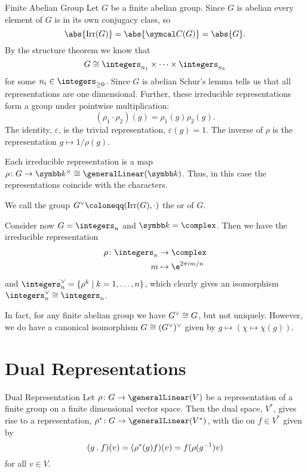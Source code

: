 \begin{exm}{Finite Abelian Group}{}
    Let \(G\) be a finite abelian group.
    Since \(G\) is abelian every element of \(G\) is in its own conjugacy class, so
    \begin{equation}
        \abs{\Irr(G)} = \abs{\conjugacyClasses(G)} = \abs{G}.
    \end{equation}
    By the structure theorem we know that
    \begin{equation}
        G \isomorphic \integers_{n_1} \times \dotsb \times \integers_{n_k}
    \end{equation}
    for some \(n_i \in \integers_{\ge 0}\).
    Since \(G\) is abelian Schur's lemma tells us that all representations are one dimensional.
    Further, these irreducible representations form a group under pointwise multiplication:
    \begin{equation}
        (\rho_1 \cdot \rho_2)(g) = \rho_1(g)\rho_2(g).
    \end{equation}
    The identity, \(\varepsilon\), is the trivial representation, \(\varepsilon(g) = 1\).
    The inverse of \(\rho\) is the representation \(g \mapsto 1/\rho(g)\).
    
    Each irreducible representation is a map \(\rho \colon G \to \field^{\times} \isomorphic \generalLinear(\field)\).
    Thus, in this case the representations coincide with the characters.
    
    We call the group \(G^{\vee} \coloneqq (\Irr(G), \cdot)\) the  or  of \(G\).
    
    Consider now \(G = \integers_n\) and \(\field = \complex\).
    Then we have the irreducible representation
    \begin{align}
        \rho \colon \integers_n &\to \complex\\
        m &\mapsto \e^{2\pi im/n}
    \end{align}
    and \(\integers_n^{\vee} = \{\rho^k \mid k = 1, \dotsc, n\}\), which clearly gives an isomorphism \(\integers_n^{\vee} \isomorphic \integers_n\).
    
    In fact, for any finite abelian group we have \(G^{\vee} \cong G\), but not uniquely.
    However, we do have a canonical isomorphism \(G \cong (G^{\vee})^{\vee}\) given by \(g \mapsto (\chi \mapsto \chi(g))\).
\end{exm}

\section{Dual Representations}
\begin{dfn}{Dual Representation}{}
    Let \(\rho \colon G \to \generalLinear(V)\) be a representation of a finite group on a finite dimensional vector space.
    Then the dual space, \(V^*\), gives rise to a representation, \(\rho^* \colon G \to \generalLinear(V^*)\), with the on \(f \in V^*\) given by
    \begin{equation}
        (g \mathbin{.} f)(v) = (\rho^*(g)f)(v) = f(\rho(g^{-1})v)
    \end{equation}
    for all \(v \in V\).
\end{dfn}


